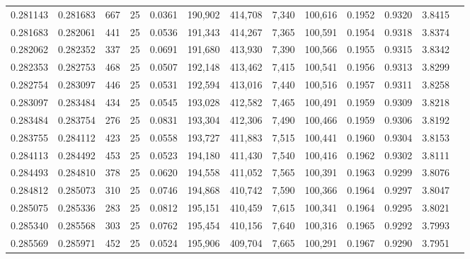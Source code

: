 \begin{tabular}{rrrrrrrrrrrrr}
0.281143 & 0.281683 &   667 &  25 &                                     0.0361 & 190,902 & 414,708 &   7,340 & 100,616 & 0.1952 & 0.9320 & 3.8415 \\
0.281683 & 0.282061 &   441 &  25 &                                     0.0536 & 191,343 & 414,267 &   7,365 & 100,591 & 0.1954 & 0.9318 & 3.8374 \\
0.282062 & 0.282352 &   337 &  25 &                                     0.0691 & 191,680 & 413,930 &   7,390 & 100,566 & 0.1955 & 0.9315 & 3.8342 \\
0.282353 & 0.282753 &   468 &  25 &                                     0.0507 & 192,148 & 413,462 &   7,415 & 100,541 & 0.1956 & 0.9313 & 3.8299 \\
0.282754 & 0.283097 &   446 &  25 &                                     0.0531 & 192,594 & 413,016 &   7,440 & 100,516 & 0.1957 & 0.9311 & 3.8258 \\
0.283097 & 0.283484 &   434 &  25 &                                     0.0545 & 193,028 & 412,582 &   7,465 & 100,491 & 0.1959 & 0.9309 & 3.8218 \\
0.283484 & 0.283754 &   276 &  25 &                                     0.0831 & 193,304 & 412,306 &   7,490 & 100,466 & 0.1959 & 0.9306 & 3.8192 \\
0.283755 & 0.284112 &   423 &  25 &                                     0.0558 & 193,727 & 411,883 &   7,515 & 100,441 & 0.1960 & 0.9304 & 3.8153 \\
0.284113 & 0.284492 &   453 &  25 &                                     0.0523 & 194,180 & 411,430 &   7,540 & 100,416 & 0.1962 & 0.9302 & 3.8111 \\
0.284493 & 0.284810 &   378 &  25 &                                     0.0620 & 194,558 & 411,052 &   7,565 & 100,391 & 0.1963 & 0.9299 & 3.8076 \\
0.284812 & 0.285073 &   310 &  25 &                                     0.0746 & 194,868 & 410,742 &   7,590 & 100,366 & 0.1964 & 0.9297 & 3.8047 \\
0.285075 & 0.285336 &   283 &  25 &                                     0.0812 & 195,151 & 410,459 &   7,615 & 100,341 & 0.1964 & 0.9295 & 3.8021 \\
0.285340 & 0.285568 &   303 &  25 &                                     0.0762 & 195,454 & 410,156 &   7,640 & 100,316 & 0.1965 & 0.9292 & 3.7993 \\
0.285569 & 0.285971 &   452 &  25 &                                     0.0524 & 195,906 & 409,704 &   7,665 & 100,291 & 0.1967 & 0.9290 & 3.7951 \\

\end{tabular}
